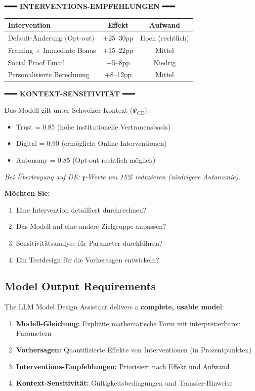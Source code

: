 \begin{tcolorbox}[colback=blue!5!white, colframe=blue!75!black,
    title=Example: GEFÜHRT Model Design (All 10 Steps), breakable]
{{\vspace{0.5em}
\textbf{━━━ INTERVENTIONS-EMPFEHLUNGEN ━━━}

\begin{tabular}{@{}lcc@{}}
\textbf{Intervention} & \textbf{Effekt} & \textbf{Aufwand} \\
\hline
Default-Änderung (Opt-out) & +25--30pp & Hoch (rechtlich) \\
Framing + Immediate Bonus & +15--22pp & Mittel \\
Social Proof Email & +5--8pp & Niedrig \\
Personalisierte Berechnung & +8--12pp & Mittel \\
\end{tabular}

\vspace{0.5em}
\textbf{━━━ KONTEXT-SENSITIVITÄT ━━━}

Das Modell gilt unter Schweizer Kontext ($\Psi_{\text{CH}}$):
\begin{itemize}[nosep]
\item Trust = 0.85 (hohe institutionelle Vertrauensbasis)
\item Digital = 0.90 (ermöglicht Online-Interventionen)
\item Autonomy = 0.85 (Opt-out rechtlich möglich)
\end{itemize}

\textit{Bei Übertragung auf DE: γ-Werte um 15\% reduzieren (niedrigere Autonomie).}
}}

\vspace{0.5em}
\textbf{Möchten Sie:}
\begin{enumerate}[nosep]
\item Eine Intervention detailliert durchrechnen?
\item Das Modell auf eine andere Zielgruppe anpassen?
\item Sensitivitätsanalyse für Parameter durchführen?
\item Ein Testdesign für die Vorhersagen entwickeln?
\end{enumerate}
\end{tcolorbox}

\subsection{Model Output Requirements}

The LLM Model Design Assistant delivers a \textbf{complete, usable model}:

\begin{enumerate}
\item \textbf{Modell-Gleichung:} Explizite mathematische Form mit interpretierbaren Parametern
\item \textbf{Vorhersagen:} Quantifizierte Effekte von Interventionen (in Prozentpunkten)
\item \textbf{Interventions-Empfehlungen:} Priorisiert nach Effekt und Aufwand
\item \textbf{Kontext-Sensitivität:} Gültigkeitsbedingungen und Transfer-Hinweise
\end{enumerate}


